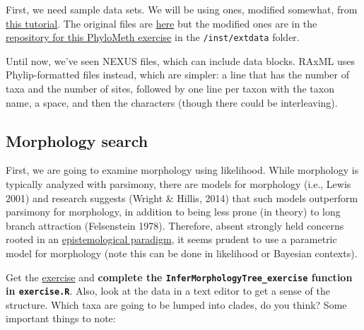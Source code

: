 \documentclass[]{article}
\theoremstyle{definition}
\theoremstyle{definition}
\theoremstyle{definition}
\theoremstyle{remark}
\begin{document}
First, we need sample data sets. We will be using ones, modified
somewhat, from
\href{http://sco.h-its.org/exelixis/web/software/raxml/hands_on.html}{this
tutorial}. The original files are
\href{http://sco.h-its.org/exelixis/resource/download/hands-on/Hands-On.tar.bz2}{here}
but the modified ones are in the
\href{https://github.com/PhyloMeth/LikelihoodTrees}{repository for this
PhyloMeth exercise} in the \texttt{/inst/extdata} folder.

Until now, we've seen NEXUS files, which can include data blocks. RAxML
uses Phylip-formatted files instead, which are simpler: a line that has
the number of taxa and the number of sites, followed by one line per
taxon with the taxon name, a space, and then the characters (though
there could be interleaving).

\hypertarget{morphology-search}{%
\subsection{Morphology search}\label{morphology-search}}

First, we are going to examine morphology using likelihood. While
morphology is typically analyzed with parsimony, there are models for
morphology (i.e., Lewis 2001) and research suggests (Wright \& Hillis,
2014) that such models outperform parsimony for morphology, in addition
to being less prone (in theory) to long branch attraction (Felsenstein
1978). Therefore, absent strongly held concerns rooted in an
\href{http://onlinelibrary.wiley.com/doi/10.1111/cla.12148/full}{epistemological
paradigm}, it seems prudent to use a parametric model for morphology
(note this can be done in likelihood or Bayesian contexts).

Get the \href{https://github.com/PhyloMeth/LikelihoodTrees}{exercise}
and \textbf{complete the \texttt{InferMorphologyTree\_exercise} function
in \texttt{exercise.R}}. Also, look at the data in a text editor to get
a sense of the structure. Which taxa are going to be lumped into clades,
do you think? Some important things to note:
\end{document}
